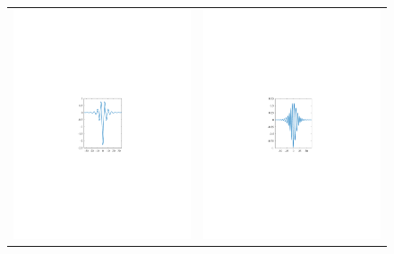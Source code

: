 \documentclass[thesis.tex]{subfiles}
\begin{document}
\begin{figure}
\centering
\begin{tabular}{cc}
\includegraphics{images/other/single1354}&
\includegraphics{images/other/single14} \\

\end{tabular}
\end{figure}
\end{document}
